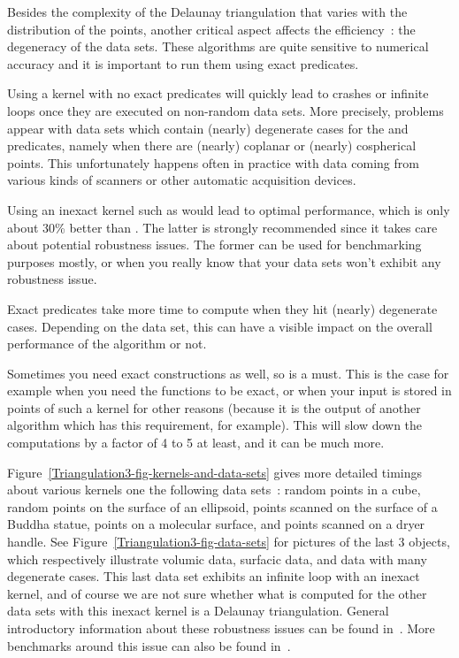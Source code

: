 Besides the complexity of the Delaunay triangulation that varies with the
distribution of the points, another critical aspect affects the efficiency~:
the degeneracy of the data sets.  These algorithms are quite sensitive to
numerical accuracy and it is important to run them using exact predicates.

Using a kernel with no exact predicates will quickly lead to crashes or
infinite loops once they are executed on non-random data sets.  More precisely,
problems appear with data sets which contain (nearly) degenerate cases for the
 and  predicates, namely when
there are (nearly) coplanar or (nearly) cospherical points.  This unfortunately
happens often in practice with data coming from various kinds of scanners or
other automatic acquisition devices.

Using an inexact kernel such as  would lead
to optimal performance, which is only about 30\% better than
.  The latter is strongly
recommended since it takes care about potential robustness issues.  The former
can be used for benchmarking purposes mostly, or when you really know that your
data sets won't exhibit any robustness issue.

Exact predicates take more time to compute when they hit (nearly) degenerate
cases.  Depending on the data set, this can have a visible impact on the
overall performance of the algorithm or not.

Sometimes you need exact constructions as well, so
 is a must.  This is the case
for example when you need the  functions to be exact, or when your
input is stored in points of such a kernel for other reasons (because it is the
output of another algorithm which has this requirement, for example).  This
will slow down the computations by a factor of 4 to 5 at least, and it can be
much more.

Figure~\ref{Triangulation3-fig-kernels-and-data-sets} gives more detailed
timings about various kernels one the following data sets~: random points in a
cube, random points on the surface of an ellipsoid, points scanned on the
surface of a Buddha statue, points on a molecular surface, and points scanned
on a dryer handle.  See Figure~\ref{Triangulation3-fig-data-sets} for pictures of
the last 3 objects, which respectively illustrate volumic data, surfacic data,
and data with many degenerate cases.  This last data set exhibits an infinite
loop with an inexact kernel, and of course we are not sure whether what is
computed for the other data sets with this inexact kernel is a Delaunay
triangulation.  General introductory information about these robustness issues
can be found in~\cite{cgta-kmpsy-08}.  More benchmarks around this issue can
also be found in~\cite{cgal:dp-eegpd-03}.

